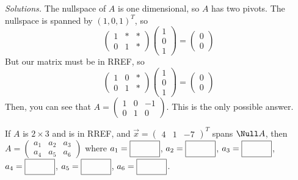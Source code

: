     \ifnum {} {\color{DarkBlue} \textit{Solutions.} 
    The nullspace of $A$ is one dimensional, so $A$ has two pivots. The nullspace is spanned by $(1,0,1)^T$, so 
  \begin{equation}
      \begin{pmatrix}
          1 & \ast & \ast \\ 0 & 1 & \ast 
      \end{pmatrix} 
      \begin{pmatrix}
          1 \\ 0 \\ 1 
      \end{pmatrix} = \begin{pmatrix}
          0 \\ 0 
      \end{pmatrix}
  \end{equation}
 But our matrix must be in RREF, so 
  \begin{equation}
      \begin{pmatrix}
          1 & 0 & \ast \\ 0 & 1 & \ast 
      \end{pmatrix} 
      \begin{pmatrix}
          1 \\ 0 \\ 1 
      \end{pmatrix} = \begin{pmatrix}
          0 \\ 0 
      \end{pmatrix}
  \end{equation} 
  Then, you can see that  $A=\begin{pmatrix}
     1 & 0 & -1 \\ 0 & 1 & 0 
 \end{pmatrix}$. This is the only possible answer. 
    } 
   \else
   \fi
\fi     


\ifnum {}
    If $A$ is $2 \times 3$ and is in RREF, and $\vec x = \begin{pmatrix} 4&1&-7\end{pmatrix}^T$ spans $\Null A$, then $A=\begin{pmatrix} a_1 & a_2 & a_3 \\ a_4 & a_5 & a_6 \end{pmatrix} $ where 
    $a_1 = \framebox{\strut\hspace{1.0cm}}$, 
    $a_2 = \framebox{\strut\hspace{1.0cm}}$, 
    $a_3 = \framebox{\strut\hspace{1.0cm}}$, 
    $a_4 = \framebox{\strut\hspace{1.0cm}}$,
    $a_5 = \framebox{\strut\hspace{1.0cm}}$,
    $a_6 = \framebox{\strut\hspace{1.0cm}}$.

